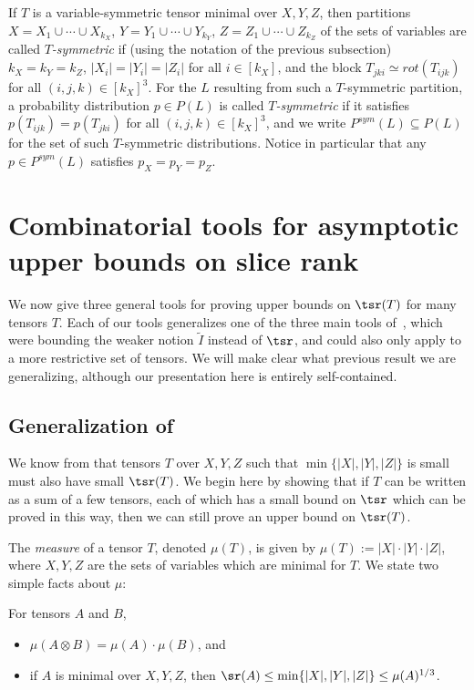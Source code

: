\documentclass{toc}
\begin{document}
If $T$ is a variable-symmetric tensor minimal over $X,Y,Z$, then partitions $X = X_1 \cup \cdots \cup X_{k_X}$, $Y = Y_1 \cup \cdots \cup Y_{k_Y}$, $Z = Z_1 \cup \cdots \cup Z_{k_Z}$ of the  
%
sets of variables
are called \emph{$T$-symmetric} if (using the notation of the previous subsection) $k_X = k_Y = k_Z$, $|X_i| = |Y_i| = |Z_i|$ for all $i \in [k_X]$, and the block $T_{jki} \simeq rot(T_{ijk})$ for all $(i,j,k) \in [k_X]^3$. For the $L$ resulting from such a $T$-symmetric partition, a probability distribution $p \in P(L)$ is called \emph{$T$-symmetric} if it satisfies $p(T_{ijk}) = p(T_{jki})$ for all $(i,j,k) \in [k_X]^3$, and we write $P^{sym}(L) \subseteq P(L)$ for the set of such $T$-symmetric distributions. Notice in particular that any $p \in P^{sym}(L)$ satisfies $p_X = p_Y = p_Z$.




%
%
\section{Combinatorial tools for asymptotic upper bounds on slice rank}
\label{secthree}

We now give three general tools for proving upper bounds on $\tsr(T)$ for many tensors $T$. Each of our tools generalizes one of the three main tools of~\cite{aw}, which were bounding the weaker notion $\tilde{I}$ instead of $\tsr$, and could also only apply to a more restrictive set of tensors. We will make clear what previous result we are generalizing, although our presentation here is entirely self-contained.

\subsection{Generalization of \cite[Theorem~5.3]{aw}}

We know from   that tensors $T$ over $X,Y,Z$ such that $\min\{|X|,|Y|,|Z|\}$ is small must also have small $\tsr(T)$. We begin here by showing that if $T$ can be written as a sum of a few tensors, each of which has a small bound on $\tsr$ which can be proved in this way, then we can still prove an upper bound on $\tsr(T)$. 

The \emph{measure} of a tensor $T$, denoted $\mu(T)$, is given by $\mu(T) := |X| \cdot |Y| \cdot |Z|$, where $X,Y,Z$ are the sets of variables which are minimal for $T$. We state two simple facts about $\mu$:

\begin{fact}
For tensors $A$ and $B$,
\begin{itemize}
    \item $\mu(A \otimes B) = \mu(A) \cdot \mu(B)$, and
    \item if $A$ is minimal over $X,Y,Z$, then $\sr(A) \leq \min\{ |X|, |Y|, |Z| \} \leq \mu(A)^{1/3}$.
\end{itemize} 
\end{fact}
\end{document}
